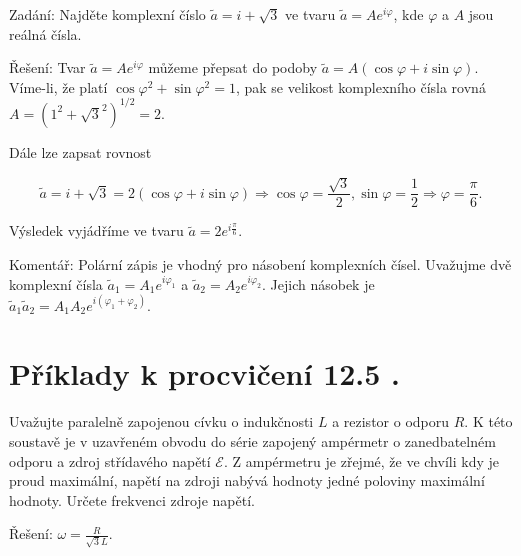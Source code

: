\documentclass[czech,11pt,a4paper]{article}
\begin{document}
Zadání: Najděte komplexní číslo $\tilde{a}=i+\sqrt{3}$ ve tvaru $\tilde{a}=A e^{i \varphi}$, kde $\varphi$ a $A$ jsou reálná čísla.

Řešení: Tvar $\tilde{a}=A e^{i \varphi}$ můžeme přepsat do podoby $\tilde{a}=A(\cos \varphi+i \sin \varphi)$. Víme-li, že platí $\cos \varphi^{2}+\sin \varphi^{2}=1$, pak se velikost komplexního čísla rovná $A=\left(1^{2}+\sqrt{3}^{2}\right)^{1 / 2}=2$.

Dále lze zapsat rovnost

$$
\tilde{a}=i+\sqrt{3}=2(\cos \varphi+i \sin \varphi) \Rightarrow \cos \varphi=\frac{\sqrt{3}}{2}, \sin \varphi=\frac{1}{2} \Rightarrow \varphi=\frac{\pi}{6} .
$$

Výsledek vyjádříme ve tvaru $\tilde{a}=2 e^{i \frac{\pi}{6}}$.

Komentář: Polární zápis je vhodný pro násobení komplexních čísel. Uvažujme dvě komplexní čísla $\tilde{a}_{1}=A_{1} e^{i \varphi_{1}}$ a $\tilde{a}_{2}=A_{2} e^{i \varphi_{2}}$. Jejich násobek je $\tilde{a}_{1} \tilde{a}_{2}=A_{1} A_{2} e^{i\left(\varphi_{1}+\varphi_{2}\right)}$.

\section{Příklady k procvičení 12.5 .}

Uvažujte paralelně zapojenou cívku o indukčnosti $L$ a rezistor o odporu $R$. K této soustavě je v uzavřeném obvodu do série zapojený ampérmetr o zanedbatelném odporu a zdroj střídavého napětí $\mathcal{E}$. Z ampérmetru je zřejmé, že ve chvíli kdy je proud maximální, napětí na zdroji nabývá hodnoty jedné poloviny maximální hodnoty. Určete frekvenci zdroje napětí.

Řešení:  $\omega=\frac{R}{\sqrt{3} L}$.
\end{document}
